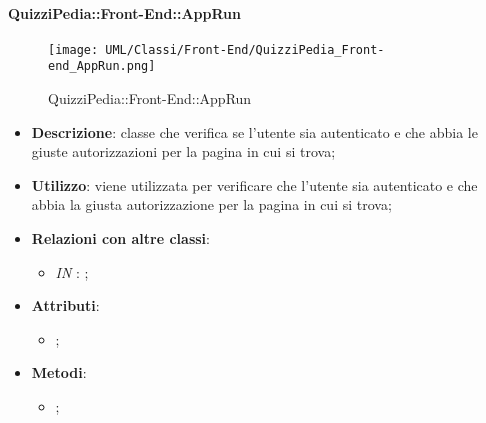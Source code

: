 
	
		
		\paragraph{QuizziPedia::Front-End::AppRun}
		
		\label{QuizziPedia::Front-End::AppRun}
		
		\begin{figure}[ht]
			\centering
			\texttt{[image: UML/Classi/Front-End/QuizziPedia\_Front-end\_AppRun.png]}
			\caption{QuizziPedia::Front-End::AppRun}
		\end{figure} \FloatBarrier
		
		\begin{itemize}
			\item \textbf{Descrizione}: classe che verifica se l'utente sia autenticato e che abbia le giuste autorizzazioni per la pagina in cui si trova;
			\item \textbf{Utilizzo}: viene utilizzata per verificare che l’utente sia autenticato e che abbia la giusta autorizzazione per la pagina in cui si trova;
			\item \textbf{Relazioni con altre classi}: 
			\begin{itemize}
				\item \textit{IN} \texttt{}: ; 
			\end{itemize}
			\item \textbf{Attributi}: 
			\begin{itemize}
				\item ;
			\end{itemize}
			\item \textbf{Metodi}: 
			\begin{itemize}
				\item ;
			\end{itemize}
		\end{itemize}
		